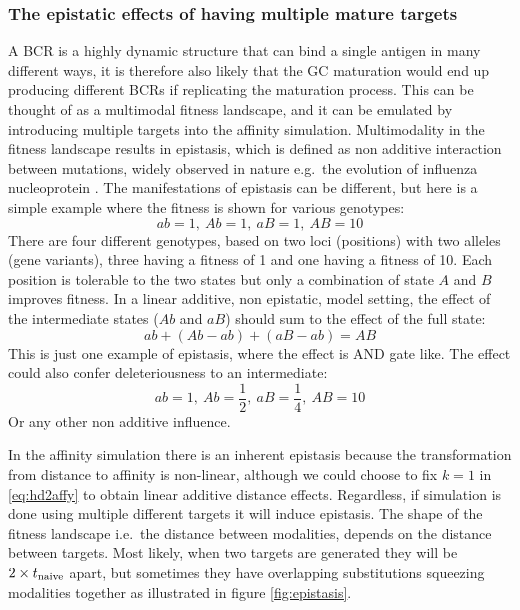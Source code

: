\subsubsection{The epistatic effects of having multiple mature targets}
A BCR is a highly dynamic structure that can bind a single antigen in many different ways, it is therefore also likely that the GC maturation would end up producing different BCRs if replicating the maturation process.
This can be thought of as a multimodal fitness landscape, and it can be emulated by introducing multiple targets into the affinity simulation.
Multimodality in the fitness landscape results in epistasis, which is defined as non additive interaction between mutations, widely observed in nature e.g.\ the evolution of influenza nucleoprotein \cite{gong2013stability}.
The manifestations of epistasis can be different, but here is a simple example where the fitness is shown for various genotypes:
$$
ab = 1,\ Ab = 1,\ aB = 1,\ AB = 10
$$
There are four different genotypes, based on two loci (positions) with two alleles (gene variants), three having a fitness of 1 and one having a fitness of 10.
Each position is tolerable to the two states but only a combination of state $A$ and $B$ improves fitness.
In a linear additive, non epistatic, model setting, the effect of the intermediate states ($Ab$ and $aB$) should sum to the effect of the full state:
$$
ab + (Ab - ab) + (aB -ab) = AB
$$
This is just one example of epistasis, where the effect is AND gate like.
The effect could also confer deleteriousness to an intermediate:
$$
ab = 1,\ Ab = \frac{1}{2},\ aB = \frac{1}{4},\ AB = 10
$$
Or any other non additive influence.

In the affinity simulation there is an inherent epistasis because the transformation from distance to affinity is non-linear, although we could choose to fix $k=1$ in \eqref{eq:hd2affy} to obtain linear additive distance effects.
Regardless, if simulation is done using multiple different targets it will induce epistasis.
The shape of the fitness landscape i.e.\ the distance between modalities, depends on the distance between targets.
Most likely, when two targets are generated they will be $2 \times t_{\text{naive}}$ apart, but sometimes they have overlapping substitutions squeezing modalities together as illustrated in figure \ref{fig:epistasis}.

